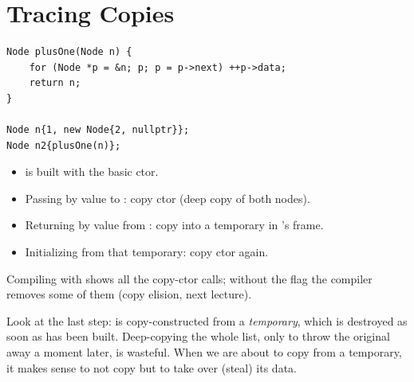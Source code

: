 \section{Tracing Copies}
\begin{lstlisting}[style=cpp]
Node plusOne(Node n) {
    for (Node *p = &n; p; p = p->next) ++p->data;
    return n;
}

Node n{1, new Node{2, nullptr}};
Node n2{plusOne(n)};
\end{lstlisting}
\begin{itemize}
  \item {} is built with the basic ctor.
  \item Passing  by value to : copy ctor (deep copy of both
        nodes).
  \item Returning  by value from : copy into a temporary
        in 's frame.
  \item Initializing  from that temporary: copy ctor again.
\end{itemize}
\begin{center}
\end{center}
Compiling with  shows all
the copy-ctor calls; without the flag the compiler removes some of them (copy
elision, next lecture).

Look at the last step:  is copy-constructed from a \emph{temporary},
which is destroyed as soon as  has been built. Deep-copying the whole
list, only to throw the original away a moment later, is wasteful. When we are
about to copy from a temporary, it makes sense to not copy but to take over
(steal) its data.


